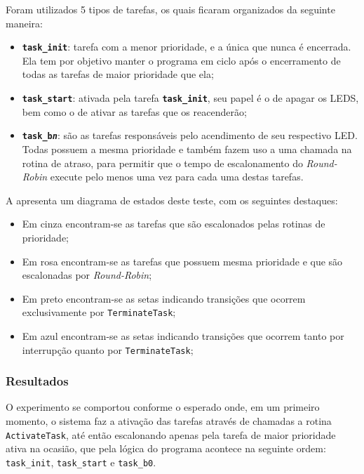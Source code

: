Foram utilizados 5 tipos de tarefas, os quais ficaram organizados da seguinte maneira:

\begin{itemize}
	\item \textbf{\texttt{task\_init}}: tarefa com a menor prioridade, e a única que nunca é encerrada. Ela tem por objetivo manter o programa em ciclo após o encerramento de todas as tarefas de maior prioridade que ela;
	\item \textbf{\texttt{task\_start}}: ativada pela tarefa \textbf{\texttt{task\_init}}, seu papel é o de apagar os LEDS, bem como o de ativar as tarefas que os reacenderão;
	\item \textbf{\texttt{task\_b\textit{n}}}: são as tarefas responsáveis pelo acendimento de seu respectivo LED. Todas possuem a mesma prioridade e também fazem uso a uma chamada na rotina de atraso, para permitir que o tempo de escalonamento do \emph{Round-Robin} execute pelo menos uma vez para cada uma destas tarefas.
\end{itemize}

A  apresenta um diagrama de estados deste teste, com os seguintes destaques:

\begin{itemize}
	\item Em cinza encontram-se as tarefas que são escalonados pelas rotinas de prioridade;
	\item Em rosa encontram-se as tarefas que possuem mesma prioridade e que são escalonadas por \emph{Round-Robin};
	\item Em preto encontram-se as setas indicando transições que ocorrem exclusivamente por \texttt{TerminateTask};
	\item Em azul encontram-se as setas indicando transições que ocorrem tanto por interrupção quanto por \texttt{TerminateTask};
\end{itemize}


\subsubsection{Resultados}

O experimento se comportou conforme o esperado onde, em um primeiro momento, o sistema faz a ativação das tarefas através de chamadas a rotina \texttt{ActivateTask}, até então escalonando apenas pela tarefa de maior prioridade ativa na ocasião, que pela lógica do programa acontece na seguinte ordem: \texttt{task\_init}, \texttt{task\_start} e \texttt{task\_b0}.

